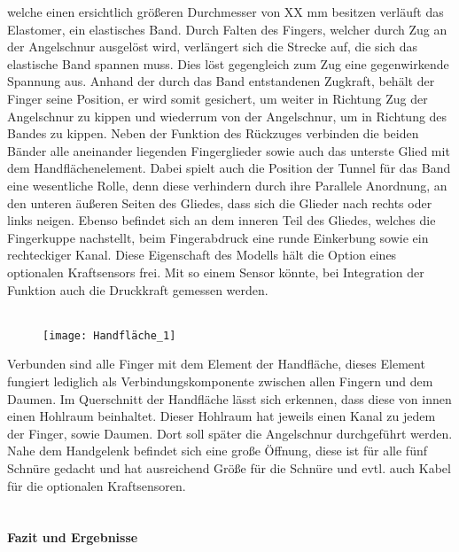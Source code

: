 \documentclass[titlepage,12pt,twoside]{article}
\begin{document}
welche einen ersichtlich größeren Durchmesser von XX mm besitzen verläuft das 
Elastomer, ein elastisches Band. Durch Falten des Fingers, welcher durch Zug an der 
Angelschnur ausgelöst wird, verlängert sich die Strecke auf, die sich das elastische 
Band spannen muss. Dies löst gegengleich zum Zug eine gegenwirkende Spannung aus. 
Anhand der durch das Band entstandenen Zugkraft, behält der Finger seine Position, 
er wird somit gesichert, um weiter in Richtung Zug der Angelschnur zu kippen und 
wiederrum von der Angelschnur, um in Richtung des Bandes zu kippen. Neben der 
Funktion des Rückzuges verbinden die beiden Bänder alle aneinander liegenden 
Fingerglieder sowie auch das unterste Glied mit dem Handflächenelement. Dabei 
spielt auch die Position der Tunnel für das Band eine wesentliche Rolle, denn 
diese verhindern durch ihre Parallele Anordnung, an den unteren äußeren Seiten 
des Gliedes, dass sich die Glieder nach rechts oder links neigen. 
Ebenso befindet sich an dem inneren Teil des Gliedes, welches die Fingerkuppe 
nachstellt, beim Fingerabdruck eine runde Einkerbung sowie ein rechteckiger Kanal. 
Diese Eigenschaft des Modells hält die Option eines optionalen Kraftsensors frei. 
Mit so einem Sensor könnte, bei Integration der Funktion auch die Druckkraft 
gemessen werden. \\
\\
\begin{figure}[H]
	\begin{center}
		\scalebox{1}
		{\texttt{[image: Handfläche\_1]}}
	\end{center}
\end{figure}
\hfill \break
Verbunden sind alle Finger mit dem Element der Handfläche, dieses Element fungiert 
lediglich als Verbindungskomponente zwischen allen Fingern und dem Daumen. 
Im Querschnitt der Handfläche lässt sich erkennen, dass diese von innen einen 
Hohlraum beinhaltet. Dieser Hohlraum hat jeweils einen Kanal zu jedem der Finger, 
sowie Daumen. Dort soll später die Angelschnur durchgeführt werden. Nahe dem 
Handgelenk befindet sich eine große Öffnung, diese ist für alle fünf Schnüre 
gedacht und hat ausreichend Größe für die Schnüre und evtl. auch Kabel für die 
optionalen Kraftsensoren. \\
\\

\paragraph{Fazit und Ergebnisse}
\hfill \break
\hfill \break
\end{document}
